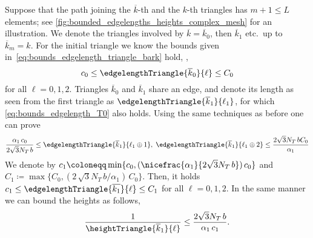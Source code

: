 Suppose that the path joining the $\overline{k}$-th and the $k$-th triangles has $m + 1 \le L$ elements; see \cref{fig:bounded_edgelengths_heights_complex_mesh} for an illustration.
We denote the triangles involved by $\overline{k} = \overline{k}_0$, then $\overline{k}_1$ etc.\ up to $\overline{k}_m = k$.
For the initial triangle we know the bounds given in~\eqref{eq:bounds_edgelength_triangle_bark} hold, \ie,
\begin{equation}
	\label{eq:bounds_edgelength_T0}
	c_0
	\le
	\edgelengthTriangle{\overline{k}_0}{\ell}
	\le
	C_0
\end{equation}
for all $\ell=0,1,2$.
Triangles $\overline{k}_0$ and $\overline{k}_1$ share an edge, and denote its length as seen from the first triangle as $\edgelengthTriangle{\overline{k}_1}{\ell_1}$, for which \eqref{eq:bounds_edgelength_T0} also holds.
Using the same techniques as before one can prove
\begin{equation}
	\label{eq:bounds_edgelength_T1}
	\frac{\alpha_1 \, c_0}{2 \sqrt{3} N_T \, b}
	\le
	\edgelengthTriangle{\overline{k}_1}{\ell_1 \oplus 1}
	,
	\;
	\edgelengthTriangle{\overline{k}_1}{\ell_1 \oplus 2}
	\le
	\frac{2\sqrt{3}N_T \, b C_0}{\alpha_1}
\end{equation}
We denote by $c_1 \coloneqq \min\{c_0,(\nicefrac{\alpha_1}{2\sqrt{3} N_T \, b}) \, c_0\}$ and $C_1 \coloneqq \max \{C_0, (2 \, \sqrt{3} N_T \, b/\alpha_1) \, C_0\}$.
	Then, it holds $c_1 \le \edgelengthTriangle{\overline{k_1}}{\ell} \le C_1$ for all $\ell = 0,1,2$.
In the same manner we can bound the heights as follows,
\begin{equation*}
	\frac{1}{\heightTriangle{\overline{k}_1}{\ell}}
	\le
	\frac{2\sqrt{3} N_T \, b}{\alpha_1 \, c_1}
	.
\end{equation*}

